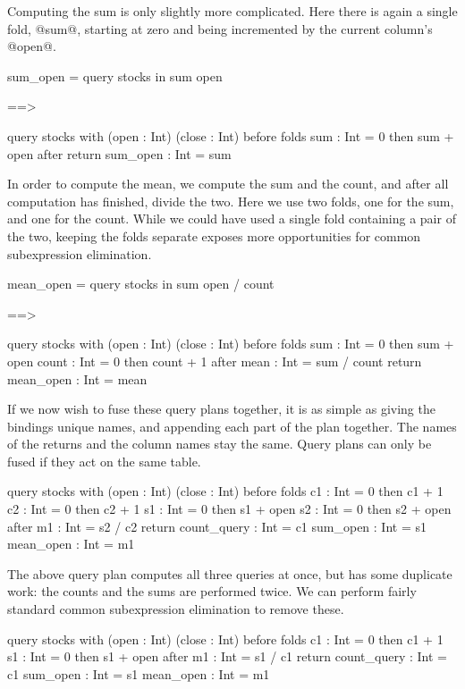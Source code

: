 Computing the sum is only slightly more complicated.
Here there is again a single fold, @sum@, starting at zero and being incremented by the current column's @open@.
\begin{code}
sum_open =
query stocks
in    sum open

==>

query stocks with (open : Int) (close : Int)
before { }
folds  { sum : Int = 0 then sum + open }
after  { }
return { sum_open : Int = sum }
\end{code}

In order to compute the mean, we compute the sum and the count, and after all computation has finished, divide the two.
Here we use two folds, one for the sum, and one for the count.
While we could have used a single fold containing a pair of the two, keeping the folds separate exposes more opportunities for common subexpression elimination.
\begin{code}
mean_open =
query stocks
in    sum open / count

==>

query stocks with (open : Int) (close : Int)
before { }
folds  { sum       : Int = 0 then sum + open 
         count     : Int = 0 then count + 1 }
after  { mean      : Int = sum / count }
return { mean_open : Int = mean }
\end{code}

If we now wish to fuse these query plans together, it is as simple as giving the bindings unique names, and appending each part of the plan together.
The names of the returns and the column names stay the same.
Query plans can only be fused if they act on the same table.
\begin{code}
query stocks with (open : Int) (close : Int)
before { }
folds  { c1 : Int = 0 then c1 + 1
         c2 : Int = 0 then c2 + 1
         s1 : Int = 0 then s1 + open 
         s2 : Int = 0 then s2 + open }
after  { m1 : Int = s2 / c2 }
return { count_query : Int = c1
         sum_open    : Int = s1
         mean_open   : Int = m1 }
\end{code}

The above query plan computes all three queries at once, but has some duplicate work: the counts and the sums are performed twice.
We can perform fairly standard common subexpression elimination to remove these.
\begin{code}
query stocks with (open : Int) (close : Int)
before { }
folds  { c1 : Int = 0 then c1 + 1
         s1 : Int = 0 then s1 + open }
after  { m1 : Int = s1 / c1 }
return { count_query : Int = c1
         sum_open    : Int = s1
         mean_open   : Int = m1 }
\end{code}

